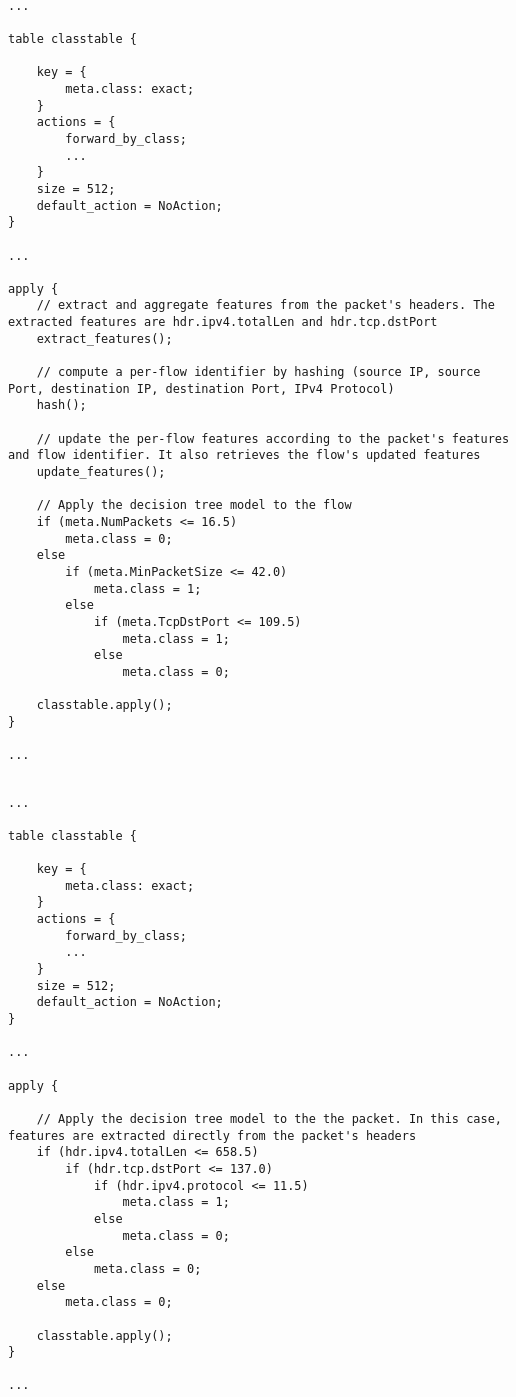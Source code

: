 
\begin{lstlisting}[float=t,caption={Main portions of the P4 code obtained by applying the \emph{ML to P4 Compiler} component to the per-flow tree of Figure \ref{fig:dtexample}.},label={lst:p4flow},frame=tb]

...

table classtable {

    key = {
        meta.class: exact;
    }
    actions = {
        forward_by_class;
        ...
    }
    size = 512;
    default_action = NoAction;
}

...

apply {
    // extract and aggregate features from the packet's headers. The extracted features are hdr.ipv4.totalLen and hdr.tcp.dstPort
    extract_features(); 

    // compute a per-flow identifier by hashing (source IP, source Port, destination IP, destination Port, IPv4 Protocol)
    hash();  
    
    // update the per-flow features according to the packet's features and flow identifier. It also retrieves the flow's updated features
    update_features(); 
   
    // Apply the decision tree model to the flow
    if (meta.NumPackets <= 16.5)
        meta.class = 0;
    else    
        if (meta.MinPacketSize <= 42.0)
            meta.class = 1;
        else    
            if (meta.TcpDstPort <= 109.5)
                meta.class = 1;
            else
                meta.class = 0;
    
    classtable.apply();                
}

...

\end{lstlisting}


\begin{lstlisting}[float=t,caption={{Main portions of the P4 code obtained by applying the \emph{ML to P4 Compiler} component to the per-packet tree of Figure \ref{fig:dtexample}}.},label={lst:p4pkt},frame=tb]

...

table classtable {

    key = {
        meta.class: exact;
    }
    actions = {
        forward_by_class;
        ...
    }
    size = 512;
    default_action = NoAction;
}

...

apply {

    // Apply the decision tree model to the the packet. In this case, features are extracted directly from the packet's headers
    if (hdr.ipv4.totalLen <= 658.5)
        if (hdr.tcp.dstPort <= 137.0)
            if (hdr.ipv4.protocol <= 11.5)
                meta.class = 1;
            else
                meta.class = 0;
        else
            meta.class = 0;
    else
        meta.class = 0;
    
    classtable.apply();                
}

...

\end{lstlisting}

